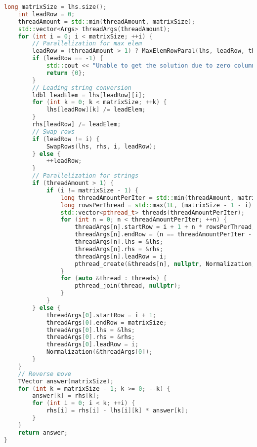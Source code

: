 \documentclass[a4paper, 12pt]{article}
\begin{document}
\begin{lstlisting}[language=C++]
    long matrixSize = lhs.size();
    int leadRow = 0;
    threadAmount = std::min(threadAmount, matrixSize);
    std::vector<Args> threadArgs(threadAmount);
    for (int i = 0; i < matrixSize; ++i) {
        // Parallelization for max elem
        leadRow = (threadAmount > 1) ? MaxElemRowParal(lhs, leadRow, threadAmount) : MaxElemRow(lhs, leadRow);
        if (leadRow == -1) {
            std::cout << "Unable to get the solution due to zero column" << std::endl;
            return {0};
        }
        // Leading string conversion
        ldbl leadElem = lhs[leadRow][i];
        for (int k = 0; k < matrixSize; ++k) {
            lhs[leadRow][k] /= leadElem;
        }
        rhs[leadRow] /= leadElem;
        // Swap rows
        if (leadRow != i) {
            SwapRows(lhs, rhs, i, leadRow);
        } else {
            ++leadRow;
        }
        // Parallelization for strings
        if (threadAmount > 1) {
            if (i != matrixSize - 1) {
                long threadAmountPerIter = std::min(threadAmount, matrixSize - i) - 1;
                long rowsPerThread = std::max(1L, (matrixSize - 1 - i) / threadAmountPerIter);
                std::vector<pthread_t> threads(threadAmountPerIter);
                for (int n = 0; n < threadAmountPerIter; ++n) {   
                    threadArgs[n].startRow = i + 1 + n * rowsPerThread; 
                    threadArgs[n].endRow = (n == threadAmountPerIter - 1) ? matrixSize : (threadArgs[n].startRow + rowsPerThread);
                    threadArgs[n].lhs = &lhs;
                    threadArgs[n].rhs = &rhs;
                    threadArgs[n].leadRow = i;
                    pthread_create(&threads[n], nullptr, Normalization, reinterpret_cast<void *>(&threadArgs[n]));
                }
                for (auto &thread : threads) {
                    pthread_join(thread, nullptr);
                }
            }
        } else {
            threadArgs[0].startRow = i + 1; 
            threadArgs[0].endRow = matrixSize;
            threadArgs[0].lhs = &lhs;
            threadArgs[0].rhs = &rhs;
            threadArgs[0].leadRow = i;
            Normalization(&threadArgs[0]);
        }
    }
    // Reverse move
    TVector answer(matrixSize);
    for (int k = matrixSize - 1; k >= 0; --k) {
        answer[k] = rhs[k];
        for (int i = 0; i < k; ++i) {
            rhs[i] = rhs[i] - lhs[i][k] * answer[k];
        }
    }
    return answer;
}
\end{lstlisting}
\end{document}
